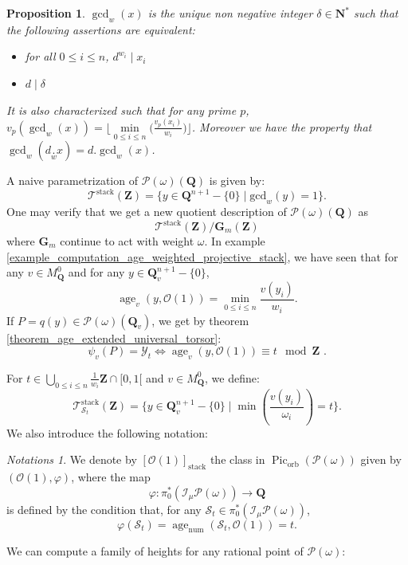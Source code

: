 \documentclass{proc-l}
\newcommand{\Z}{\mathbf{Z}}
\newcommand{\N}{\mathbf{N}}
\newcommand{\Q}{\mathbf{Q}}
\newcommand{\I}{\mathcal{I}}
\newcommand{\G}{\mathbf{G}}
\DeclareMathOperator{\Pic}{Pic}
\DeclareMathOperator{\stack}{stack}
\DeclareMathOperator{\num}{num}
\DeclareMathOperator{\age}{age}
\DeclareMathOperator{\orb}{orb}
\newcommand{\stackY}{\mathcal{Y}}
\newcommand{\stackS}{\mathcal{S}}
\newcommand{\stackT}{\mathcal{T}}
\newcommand{\stackP}{\mathcal{P}}
\newcommand{\sheafO}{\mathcal{O}}
\newcommand{\w}{\omega}
\newtheorem{prop}[theorem]{Proposition}
\theoremstyle{definition}
\theoremstyle{remark}
\newtheorem{Notations}[theorem]{Notations}
\numberwithin{equation}{section}
\begin{document}
\begin{prop}
    $\gcd_w(x)$ is the unique non negative integer $\delta \in \N^*$ such that the following assertions are equivalent:
    \begin{itemize}
        \item for all $0 \leqslant i \leqslant n$, $d^{w_i} \mid x_i$
        \item $d \mid \delta$
    \end{itemize}
    It is also characterized such that for any prime $p$, $v_p (\gcd_w (x)) = \lfloor \min\limits_{0 \leqslant i \leqslant n} \big( \frac{v_p(x_i)}{w_i} \big) \rfloor$. Moreover we have the property that $\gcd_w (d \underset{w}{.} x) = d . \gcd_w (x)$.
\end{prop}

A naive parametrization of $\stackP(\w)(\Q)$ is given by:
\begin{equation}\label{equation_example_parametrisation_naive_pw}
    \stackT^{\stack}(\Z) = \{ y \in \Q^{n+1}-\{0\} \mid \text{gcd}_w(y) = 1 \}  .
\end{equation}One may verify that we get a new quotient description of $\stackP(\w)(\Q)$ as $$ \stackT^{\stack}(\Z) / \G_m(\Z) $$where $\G_m$ continue to act with weight $\w$. In example \ref{example_computation_age_weighted_projective_stack}, we have seen that for any $v \in M_{\Q}^0$ and for any $y \in \Q_v^{n+1}-\{0\}$, $$\age_v(y,\sheafO(1)) = \min\limits_{0 \leqslant i \leqslant n} \frac{v(y_i)}{w_i} .$$If $P = q(y) \in \stackP(\w)(\Q_v)$, we get by theorem \ref{theorem_age_extended_universal_torsor}:
\begin{equation}\label{equation_computation_residue_map_weighted_projective_stack}
    \psi_v(P) = \stackY_t  \Leftrightarrow  \age_v(y,\sheafO(1)) \equiv t \mod \Z \, \, .
\end{equation}

For $t \in \bigcup\limits_{0 \leqslant i \leqslant n} \frac{1}{w_i} \Z \cap [0,1[$ and $v \in M_{\Q}^0$, we define:
\begin{equation}
    \stackT^{\stack}_{\stackS_t}(\Z) = \{ y \in \Q_v^{n+1}-\{0\} \mid \min\left(\frac{v(y_i)}{\w_i} \right) = t \}  .
\end{equation}We also introduce the following notation:
\begin{Notations}
We denote by $[\sheafO(1)]_{\stack}$ the class in $\Pic_{\orb}(\stackP(\w))$ given by
$(\sheafO(1),\varphi)$, where the map
\[
\varphi : \pi_0^*(\I_{\mu} \stackP(\w)) \longrightarrow \Q
\]
is defined by the condition that, for any $\stackS_t \in \pi_0^*(\I_{\mu} \stackP(\w))$,
\[
\varphi(\stackS_t) = \age_{\num}(\stackS_t,\sheafO(1)) = t.
\]  
\end{Notations}
We can compute a family of heights for any rational point of $\stackP(\w)$:
\end{document}
